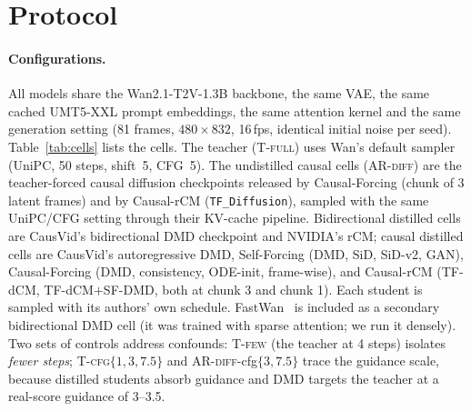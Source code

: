 \documentclass[10pt,twocolumn,letterpaper]{article}
\newcommand{\Tfull}{\textsc{T-full}}\newcommand{\ARdiff}{\textsc{AR-diff}}
\begin{document}
\section{Protocol}\label{sec:protocol}
\paragraph{Configurations.} All models share the Wan2.1-T2V-1.3B backbone, the same VAE, the same cached UMT5-XXL prompt embeddings, the same attention kernel and the same generation setting (81 frames, $480{\times}832$, 16\,fps, identical initial noise per seed). Table~\ref{tab:cells} lists the cells. The teacher (\Tfull) uses Wan's default sampler (UniPC, 50 steps, shift~5, CFG~5). The undistilled causal cells (\ARdiff) are the teacher-forced causal diffusion checkpoints released by Causal-Forcing (chunk of 3 latent frames) and by Causal-rCM (\texttt{TF\_Diffusion}), sampled with the same UniPC/CFG setting through their KV-cache pipeline. Bidirectional distilled cells are CausVid's bidirectional DMD checkpoint and NVIDIA's rCM; causal distilled cells are CausVid's autoregressive DMD, Self-Forcing (DMD, SiD, SiD-v2, GAN), Causal-Forcing (DMD, consistency, ODE-init, frame-wise), and Causal-rCM (TF-dCM, TF-dCM$+$SF-DMD, both at chunk 3 and chunk 1). Each student is sampled with its authors' own schedule. FastWan~\cite{fastwan} is included as a secondary bidirectional DMD cell (it was trained with sparse attention; we run it densely). Two sets of controls address confounds: \textsc{T-few} (the teacher at 4 steps) isolates \emph{fewer steps}; \textsc{T-cfg}$\{1,3,7.5\}$ and \ARdiff-cfg$\{3,7.5\}$ trace the guidance scale, because distilled students absorb guidance and DMD targets the teacher at a real-score guidance of 3--3.5.
\end{document}
